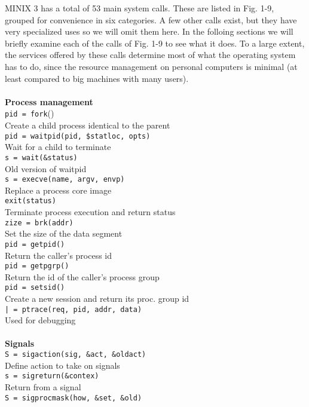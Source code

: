 \documentclass{book}
\newcommand {\kw}  [1] {\textbf{#1}}
\newcommand {\cmd} [1] {\texttt{#1}}
\begin{document}
MINIX 3 has a total of 53 main system calls.
These are listed in Fig. 1-9, grouped for convenience in six categories.
A few other calls exist, but they have very specialized uses so we will omit them here.
In the folloing sections we will briefly examine each of the calls of Fig. 1-9 to see what it does.
To a large extent, the services offered by these calls determine most of what the operating system has to do, 
since the resource management on personal computers is minimal (at least compared to big machines with many users).
\\
\\
\kw{Process management}\\
\cmd{pid = fork}()\\
Create a child process identical to the parent
\\
\cmd{pid = waitpid(pid, \$statloc, opts)}\\
Wait for a child to terminate
\\
\cmd{s = wait(\&status)}\\
Old version of waitpid
\\
\cmd{s = execve(name, argv, envp)}\\
Replace a process core image
\\
\cmd{exit(status)}\\
Terminate process execution and return status
\\
\cmd{zize = brk(addr)}\\
Set the size of the data segment
\\
\cmd{pid = getpid()}\\
Return the caller's process id
\\
\cmd{pid = getpgrp()}\\
Return the id of the caller's process group
\\
\cmd{pid = setsid()}\\
Create a new session and return its proc. group id
\\
\cmd{| = ptrace(req, pid, addr, data)}\\
Used for debugging
\\
\\
\kw{Signals}\\
\cmd{S = sigaction(sig, \&act, \&oldact)}\\
Define action to take on signals
\\
\cmd{s = sigreturn(\&contex)}\\
Return from a signal
\\
\cmd{S = sigprocmask(how, \&set, \&old)}\\
\end{document}
